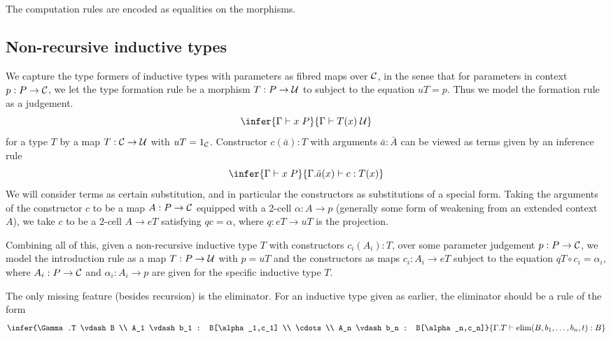 \documentclass[../thesis.tex]{subfiles}
\begin{document}
The computation rules are encoded as equalities on the morphisms.



\subsection{Non-recursive inductive types}
We capture the type formers of inductive types with parameters as fibred maps over ${\mathcal{C}}$, in the sense that for
parameters in context $p : P \to {\mathcal{C}}$, we let the type formation rule be a morphism $T : P \to {\mathcal{U}}$ to subject
to the equation $uT = p$. Thus we model the formation rule as a judgement.
\[\infer{\Gamma \vdash x\;P}{\Gamma \vdash T(x)\;\cU}\]
for a type $T$ by a map $T : {\mathcal{C}} \to {\mathcal{U}}$ with $uT = 1_{\mathcal{C}}$. Constructor $c(\bar a) : T$ with arguments
$\bar a : \bar A$ can be viewed as terms given by an inference rule
\[\infer{\Gamma \vdash x \; P}{\Gamma.\bar a(x) \vdash c : T(x)}\]
We will consider terms as certain substitution, and in particular the constructors as substitutions of a special
form. Taking the arguments of the constructor $c$ to be a map $A : P \to {\mathcal{C}}$ equipped with a 2-cell $\alpha : A
\to p$ (generally some form of weakening from an extended context $A$), we take $c$ to be a 2-cell $A \to eT$
satisfying $q c = \alpha$, where $q : eT \to uT$ is the projection.

Combining all of this, given a non-recursive inductive type $T$ with constructors $c_i(A_i) : T$, over some
parameter judgement $p : P \to {\mathcal{C}}$, we model the introduction rule as a map $T : P \to {\mathcal{U}}$ with $p = uT$
and the constructors as maps $c_i : A_i \to eT$ subject to the equation $qT \circ c_i = \alpha_i$, where
$A_i : P \to {\mathcal{C}}$ and $\alpha_i : A_i \to p$ are given for the specific inductive type $T$.

The only missing feature (besides recursion) is the eliminator. For an inductive type given as earlier, the
eliminator should be a rule of the form
\[\infer{\Gamma.T \vdash B \\ A_1 \vdash b_1 : B[\alpha_1,c_1] \\ \cdots \\ A_n \vdash b_n : B[\alpha_n,c_n]}
{\Gamma.T \vdash \elim(B,b_1,\dots,b_n,t) : B}\]
\end{document}
